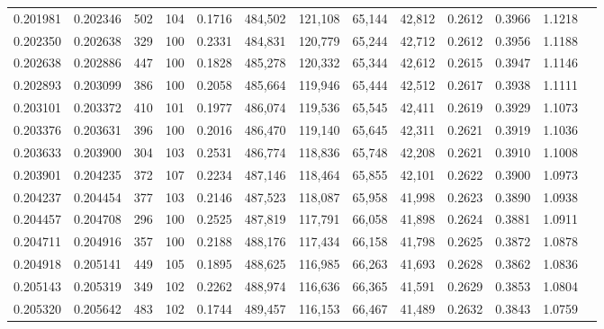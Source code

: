 \begin{tabular}{rrrrrrrrrrrrr}
0.201981 & 0.202346 &   502 & 104 &                                     0.1716 & 484,502 & 121,108 &  65,144 &  42,812 & 0.2612 & 0.3966 & 1.1218 \\
0.202350 & 0.202638 &   329 & 100 &                                     0.2331 & 484,831 & 120,779 &  65,244 &  42,712 & 0.2612 & 0.3956 & 1.1188 \\
0.202638 & 0.202886 &   447 & 100 &                                     0.1828 & 485,278 & 120,332 &  65,344 &  42,612 & 0.2615 & 0.3947 & 1.1146 \\
0.202893 & 0.203099 &   386 & 100 &                                     0.2058 & 485,664 & 119,946 &  65,444 &  42,512 & 0.2617 & 0.3938 & 1.1111 \\
0.203101 & 0.203372 &   410 & 101 &                                     0.1977 & 486,074 & 119,536 &  65,545 &  42,411 & 0.2619 & 0.3929 & 1.1073 \\
0.203376 & 0.203631 &   396 & 100 &                                     0.2016 & 486,470 & 119,140 &  65,645 &  42,311 & 0.2621 & 0.3919 & 1.1036 \\
0.203633 & 0.203900 &   304 & 103 &                                     0.2531 & 486,774 & 118,836 &  65,748 &  42,208 & 0.2621 & 0.3910 & 1.1008 \\
0.203901 & 0.204235 &   372 & 107 &                                     0.2234 & 487,146 & 118,464 &  65,855 &  42,101 & 0.2622 & 0.3900 & 1.0973 \\
0.204237 & 0.204454 &   377 & 103 &                                     0.2146 & 487,523 & 118,087 &  65,958 &  41,998 & 0.2623 & 0.3890 & 1.0938 \\
0.204457 & 0.204708 &   296 & 100 &                                     0.2525 & 487,819 & 117,791 &  66,058 &  41,898 & 0.2624 & 0.3881 & 1.0911 \\
0.204711 & 0.204916 &   357 & 100 &                                     0.2188 & 488,176 & 117,434 &  66,158 &  41,798 & 0.2625 & 0.3872 & 1.0878 \\
0.204918 & 0.205141 &   449 & 105 &                                     0.1895 & 488,625 & 116,985 &  66,263 &  41,693 & 0.2628 & 0.3862 & 1.0836 \\
0.205143 & 0.205319 &   349 & 102 &                                     0.2262 & 488,974 & 116,636 &  66,365 &  41,591 & 0.2629 & 0.3853 & 1.0804 \\
0.205320 & 0.205642 &   483 & 102 &                                     0.1744 & 489,457 & 116,153 &  66,467 &  41,489 & 0.2632 & 0.3843 & 1.0759 \\

\end{tabular}
